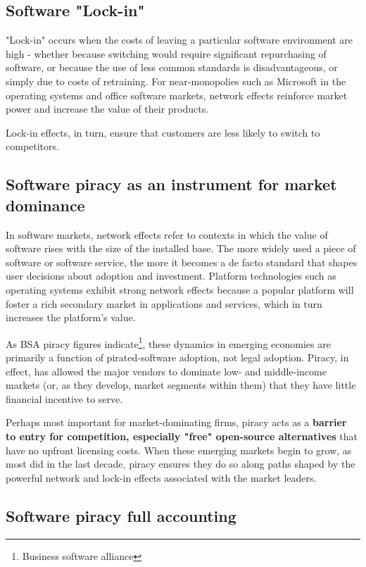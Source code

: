 \documentclass[times, utf8, seminar]{fit}
\begin{document}
\subsection{Software "Lock-in"}

"Lock-in" occurs when the costs of leaving a particular software environment are high - whether because switching would require significant repurchasing of software, or because the use of less common standards is disadvantageous, or simply due to costs of retraining. For near-monopolies such as Microsoft in the operating systems and office software markets, network effects reinforce market power and increase the value of their products.

Lock-in effects, in turn, ensure that customers are less likely to switch to competitors.

\subsection{Software piracy as an instrument for market dominance}  

In software markets, network effects refer to contexts in which the value of software rises with the size of the installed base. The more widely used a piece of software or software service, the more it becomes a de facto standard that shapes user decisions about adoption and investment. Platform technologies such as operating systems exhibit strong network effects because a popular platform will foster a rich secondary market in applications and services, which in turn increases the platform’s value. 

As BSA piracy figures indicate\footnote{Business software alliance}, these dynamics in emerging economies are primarily a function of pirated-software adoption, not legal adoption. Piracy, in effect, has allowed the major vendors to dominate low- and middle-income markets (or, as they develop, market segments within them) that they have little financial incentive to serve. 

Perhaps most important for market-dominating firms, piracy acts as a \textbf{barrier to entry for competition, especially "free" open-source alternatives} that have no upfront licensing costs. When these emerging markets begin to grow, as most did in the last decade, piracy ensures they do so along paths shaped by the powerful network and lock-in effects associated with the market leaders.

\subsection{Software piracy full accounting}
\end{document}
